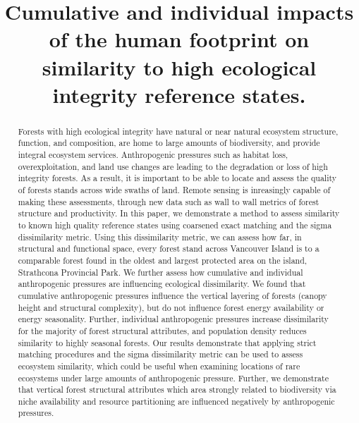 \documentclass[
]{agujournal2019}
\begin{document}
\title{Cumulative and individual impacts of the human footprint on
similarity to high ecological integrity reference states.}



\begin{abstract}
Forests with high ecological integrity have natural or near natural
ecosystem structure, function, and composition, are home to large
amounts of biodiversity, and provide integral ecosystem services.
Anthropogenic pressures such as habitat loss, overexploitation, and land
use changes are leading to the degradation or loss of high integrity
forests. As a result, it is important to be able to locate and assess
the quality of forests stands across wide swaths of land. Remote sensing
is inreasingly capable of making these assessments, through new data
such as wall to wall metrics of forest structure and productivity. In
this paper, we demonstrate a method to assess similarity to known high
quality reference states using coarsened exact matching and the sigma
dissimilarity metric. Using this dissimilarity metric, we can assess how
far, in structural and functional space, every forest stand across
Vancouver Island is to a comparable forest found in the oldest and
largest protected area on the island, Strathcona Provincial Park. We
further assess how cumulative and individual anthropogenic pressures are
influencing ecological dissimilarity. We found that cumulative
anthropogenic pressures influence the vertical layering of forests
(canopy height and structural complexity), but do not influence forest
energy availability or energy seasonality. Further, individual
anthropogenic pressures increase dissimilarity for the majority of
forest structural attributes, and population density reduces similarity
to highly seasonal forests. Our results demonstrate that applying strict
matching procedures and the sigma dissimilarity metric can be used to
assess ecosystem similarity, which could be useful when examining
locations of rare ecosystems under large amounts of anthropogenic
pressure. Further, we demonstrate that vertical forest structural
attributes which area strongly related to biodiversity via niche
availability and resource partitioning are influenced negatively by
anthropogenic pressures.
\end{abstract}
\end{document}
